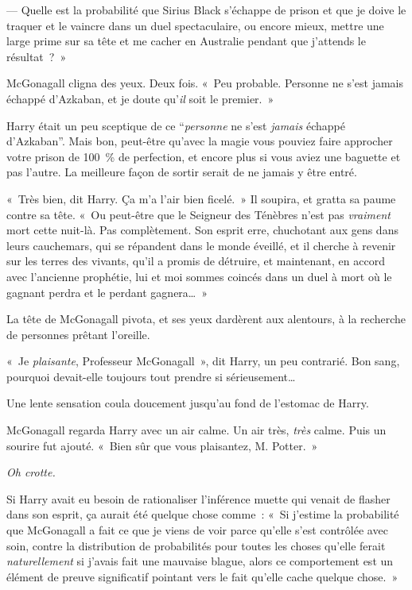 --- Quelle est la probabilité que Sirius Black s'échappe de prison et que je doive le traquer et le vaincre dans un duel spectaculaire, ou encore mieux, mettre une large prime sur sa tête et me cacher en Australie pendant que j'attends le résultat~?~»

McGonagall cligna des yeux. Deux fois. «~Peu probable. Personne ne s'est jamais échappé d'Azkaban, et je doute qu'\emph{il} soit le premier.~»

Harry était un peu sceptique de ce “\emph{personne} ne s'est \emph{jamais} échappé d'Azkaban”. Mais bon, peut-être qu'avec la magie vous pouviez faire approcher votre prison de 100~\% de perfection, et encore plus si vous aviez une baguette et pas l'autre. La meilleure façon de sortir serait de ne jamais y être entré.

«~Très bien, dit Harry. Ça m'a l'air bien ficelé.~» Il soupira, et gratta sa paume contre sa tête. «~Ou peut-être que le Seigneur des Ténèbres n'est pas \emph{vraiment} mort cette nuit-là. Pas complètement. Son esprit erre, chuchotant aux gens dans leurs cauchemars, qui se répandent dans le monde éveillé, et il cherche à revenir sur les terres des vivants, qu'il a promis de détruire, et maintenant, en accord avec l'ancienne prophétie, lui et moi sommes coincés dans un duel à mort où le gagnant perdra et le perdant gagnera…~»

La tête de McGonagall pivota, et ses yeux dardèrent aux alentours, à la recherche de personnes prêtant l'oreille.

«~Je \emph{plaisante}, Professeur McGonagall~», dit Harry, un peu contrarié. Bon sang, pourquoi devait-elle toujours tout prendre si sérieusement…

Une lente sensation coula doucement jusqu'au fond de l'estomac de Harry.

McGonagall regarda Harry avec un air calme. Un air très, \emph{très} calme. Puis un sourire fut ajouté. «~Bien sûr que vous plaisantez, M. Potter.~»

\emph{Oh crotte.}

Si Harry avait eu besoin de rationaliser l'inférence muette qui venait de flasher dans son esprit, ça aurait été quelque chose comme~: «~Si j'estime la probabilité que McGonagall a fait ce que je viens de voir parce qu'elle s'est contrôlée avec soin, contre la distribution de probabilités pour toutes les choses qu'elle ferait \emph{naturellement} si j'avais fait une mauvaise blague, alors ce comportement est un élément de preuve significatif pointant vers le fait qu'elle cache quelque chose.~»

